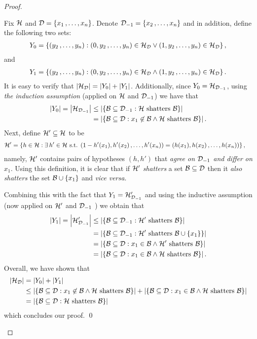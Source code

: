 \documentclass[11pt]{article}
\begin{document}
\begin{itemize}
\begin{proof}
\begin{enumerate}
Fix $\cH$ and $\cD = \set{x_1 \xdotx{,} x_n}$. Denote $\cD_{-1} = \set{x_2 \xdotx{,} x_n}$ and in addition, define the
following two sets:
\begin{align*}
Y_{0} = \set{(y_2 \xdotx{,} y_n): (0, y_2 \xdotx{,} y_n) \in \cH_{\cD} \lor  (1, y_2 \xdotx{,} y_n) \in \cH_{\cD}},
\end{align*}
and
\begin{align*}
Y_{1} = \set{(y_2 \xdotx{,} y_n): (0, y_2 \xdotx{,} y_n) \in \cH_{\cD} \land  (1, y_2 \xdotx{,} y_n) \in \cH_{\cD}}.
\end{align*}
It is easy to verify that $\abs{\cH_{\cD}} = \abs{Y_0} + \abs{Y_1}$. Additionally, since $Y_0 = \cH_{\cD_{-1}}$, using \emph{the induction assumption} (applied on $\cH$ and $\cD_{-1}$) we have that
\begin{align*}
\abs{Y_0} = \abs{\cH_{\cD_{-1}}} &\le \abs{\set{\cB \subseteq \cD_{-1}: \cH\text{ shatters }\cB}} \\
&=  \abs{\set{\cB \subseteq \cD: x_1 \not\in \cB \land \cH\text{ shatters }\cB}}.
\end{align*}
Next, define $\cH' \subseteq \cH$ to be
\begin{align*}
\cH'  &= \set{h \in \cH : \exists\,h' \in \cH\text{ s.t. }(1 - h'(x_1), h'(x_2) \xdotx{,} h'(x_n)) = (h(x_1), h(x_2)  \xdotx{,} h(x_n)) },
\end{align*}
namely, $\cH'$ contains pairs of hypotheses $(h, h')$ that \emph{agree on $\cD_{-1}$ and differ on $x_1$}. Using this definition, it is clear that if $\cH'$ \emph{shatters} a set $\cB \subseteq \cD$ then it \emph{also shatters} the set $\cB \cup \set{x_1}$ and \emph{vice versa}. 

Combining this with the fact that $Y_1 = \cH'_{\cD_{-1}}$ and using the inductive assumption (now applied on $\cH'$ and $\cD_{-1}$ ) we obtain that
\begin{align*}
\abs{Y_1} = \abs{ \cH'_{\cD_{-1}}} &\le \abs{\set{\cB \subseteq \cD_{-1}:  \cH'\text{ shatters }\cB }} \\
&= \abs{\set{\cB \subseteq \cD_{-1}:  \cH'\text{ shatters }\cB\cup\set{x_1} }} \\
&= \abs{\set{\cB \subseteq \cD:  x_1 \in \cB \land \cH'\text{ shatters }\cB }} \\
&= \abs{\set{\cB \subseteq \cD:  x_1 \in \cB \land \cH \text{ shatters }\cB }}.
\end{align*}
Overall, we have shown that
\begin{align*}
\abs{\cH_{\cD}} &= \abs{Y_0} + \abs{Y_1} \\
&\le \abs{\set{\cB \subseteq \cD: x_1 \not\in \cB \land \cH\text{ shatters }\cB}} +  \abs{\set{\cB \subseteq \cD:  x_1 \in \cB \land \cH \text{ shatters }\cB }}\\
&= \abs{\set{\cB \subseteq \cD: \cH\text{ shatters }\cB}}
\end{align*}
which concludes our proof. \qed
\end{enumerate}
\end{proof}
\end{itemize}
\end{document}
